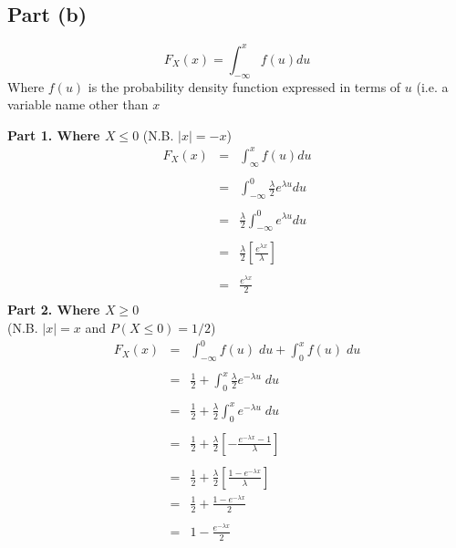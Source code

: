 \documentclass[a4paper,12pt]{article}
\begin{document}
	\subsection*{Part (b)}
	
	\begin{framed}
		\[ F_X(x) = \int^{x}_{-\infty}f(u) du \]
		Where $f(u)$ is the probability density function expressed in terms of $u$ (i.e. a variable name other than $x$
	\end{framed}
	
	\noindent \textbf{Part 1. Where $X \leq 0$ }
	(N.B. $\mid x \mid = - x$)
	\begin{eqnarray*}
		F_X(x) &=&  \int^{x}_{\infty}f(u) du \\
		& & \\
		&=& \int^{0}_{-\infty} \frac{\lambda}{2}e^{ \lambda  u} du\\
		& & \\
		&=& \frac{\lambda}{2} \int^{0}_{-\infty} e^{ \lambda  u} du\\
		& & \\
		&=& \frac{\lambda}{2} \left[ \frac{e^{\lambda x}}{\lambda} \right]\\
		& & \\
		&=& \frac{e^{\lambda x}}{2}\\
	\end{eqnarray*}
	\newpage
	\noindent \textbf{Part 2. Where $X \geq 0$ }\\
	(N.B. $\mid x \mid =  x$ and $P(X\leq 0) = 1/2$)\\
	\begin{eqnarray*}
		F_X(x) &=&  \int^{0}_{-\infty} f(u)\; du + \int^{x}_{0} f(u) \;du\\
		& & \\
		&=& \frac{1}{2} + \int^{x}_{0} \frac{\lambda}{2}e^{ - \lambda  u} \;du\\
		& & \\
		&=& \frac{1}{2} +\frac{\lambda}{2} \int^{x}_{0} e^{ - \lambda  u} \;du\\
		& & \\
		&=& \frac{1}{2} +\frac{\lambda}{2} \left[- \frac{e^{-\lambda x}-1}{\lambda} \right]\\
		& & \\
		&=& \frac{1}{2} + \frac{\lambda}{2} \left[\frac{1 - e^{-\lambda x}}{\lambda} \right]\\
		&=& \frac{1}{2} + \frac{1 - e^{-\lambda x}}{2} \\
		& & \\
		&=& 1 -  \frac{e^{-\lambda x}}{2} \\
	\end{eqnarray*}
	
\end{document}
